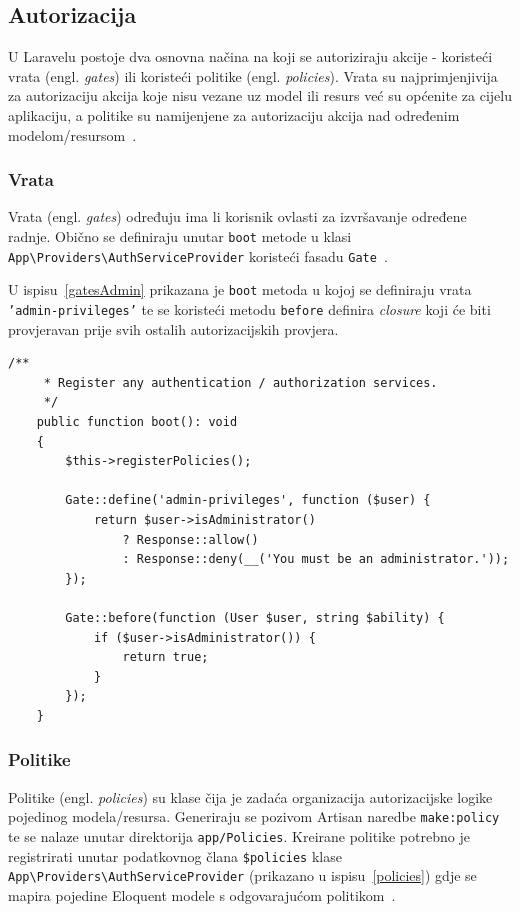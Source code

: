 \subsection{Autorizacija}
U Laravelu postoje dva osnovna načina na koji se autoriziraju akcije - koristeći vrata (engl. \textit{gates}) ili koristeći politike (engl. \textit{policies}). Vrata su najprimjenjivija za autorizaciju akcija koje nisu vezane uz model ili resurs već su općenite za cijelu aplikaciju, a politike su namijenjene za autorizaciju akcija nad određenim modelom/resursom~\cite{authorization}.

\subsubsection{Vrata}
Vrata (engl. \textit{gates}) određuju ima li korisnik ovlasti za izvršavanje određene radnje. Obično se definiraju unutar \texttt{boot} metode u klasi \\ {\texttt{App\textbackslash Providers\textbackslash AuthServiceProvider}} koristeći fasadu \texttt{Gate}~\cite{authorization}.

U ispisu~\ref{gatesAdmin} prikazana je \texttt{boot} metoda u kojoj se definiraju vrata \\ \texttt{'admin-privileges'} te se koristeći metodu \texttt{before} definira \textit{closure} koji će biti provjeravan prije svih ostalih autorizacijskih provjera.

\begin{lstlisting}[caption={Vrata korištena za implementaciju admin korisnika i administratorskog sučelja}, label=gatesAdmin]
    /**
     * Register any authentication / authorization services.
     */
    public function boot(): void
    {
        $this->registerPolicies();

        Gate::define('admin-privileges', function ($user) {
            return $user->isAdministrator()
                ? Response::allow()
                : Response::deny(__('You must be an administrator.'));
        });

        Gate::before(function (User $user, string $ability) {
            if ($user->isAdministrator()) {
                return true;
            }
        });
    }
\end{lstlisting}

\subsubsection{Politike}
Politike (engl. \textit{policies}) su klase čija je zadaća organizacija autorizacijske logike pojedinog modela/resursa. Generiraju se pozivom Artisan naredbe \texttt{make:policy} te se nalaze unutar direktorija \texttt{app/Policies}. Kreirane politike potrebno je registrirati unutar podatkovnog člana \texttt{\$policies} klase {\texttt{App\textbackslash Providers\textbackslash AuthServiceProvider}}  (prikazano u ispisu~\ref{policies}) gdje se mapira pojedine Eloquent modele s odgovarajućom politikom~\cite{authorization}.

